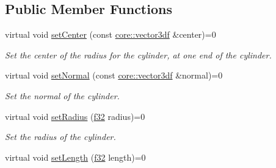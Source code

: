\subsection*{Public Member Functions}
\begin{DoxyCompactItemize}
\item 
\mbox{\label{classirr_1_1scene_1_1IParticleCylinderEmitter_a93e13715b485cc732e11d1e551b6fd97}} 
virtual void \hyperlink{classirr_1_1scene_1_1IParticleCylinderEmitter_a93e13715b485cc732e11d1e551b6fd97}{set\+Center} (const \hyperlink{namespaceirr_1_1core_a06f169d08b5c429f5575acb7edbad811}{core\+::vector3df} \&center)=0
\begin{DoxyCompactList}\small\item\em Set the center of the radius for the cylinder, at one end of the cylinder. \end{DoxyCompactList}\item 
\mbox{\label{classirr_1_1scene_1_1IParticleCylinderEmitter_a15fdc31ab77f659ee7d10b3c6bec7bb6}} 
virtual void \hyperlink{classirr_1_1scene_1_1IParticleCylinderEmitter_a15fdc31ab77f659ee7d10b3c6bec7bb6}{set\+Normal} (const \hyperlink{namespaceirr_1_1core_a06f169d08b5c429f5575acb7edbad811}{core\+::vector3df} \&normal)=0
\begin{DoxyCompactList}\small\item\em Set the normal of the cylinder. \end{DoxyCompactList}\item 
\mbox{\label{classirr_1_1scene_1_1IParticleCylinderEmitter_a5961ae932128327520e3c961edd943be}} 
virtual void \hyperlink{classirr_1_1scene_1_1IParticleCylinderEmitter_a5961ae932128327520e3c961edd943be}{set\+Radius} (\hyperlink{namespaceirr_a0277be98d67dc26ff93b1a6a1d086b07}{f32} radius)=0
\begin{DoxyCompactList}\small\item\em Set the radius of the cylinder. \end{DoxyCompactList}\item 
\mbox{\label{classirr_1_1scene_1_1IParticleCylinderEmitter_aa074f71486084c28bd374c3714d3d9ef}} 
virtual void \hyperlink{classirr_1_1scene_1_1IParticleCylinderEmitter_aa074f71486084c28bd374c3714d3d9ef}{set\+Length} (\hyperlink{namespaceirr_a0277be98d67dc26ff93b1a6a1d086b07}{f32} length)=0

\end{DoxyCompactItemize}
